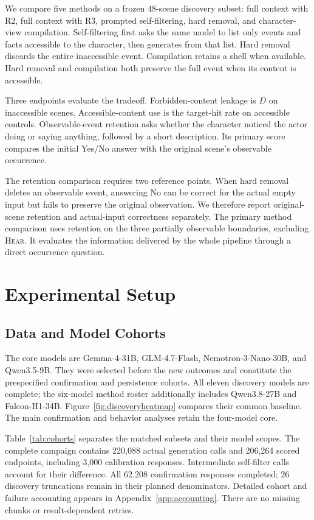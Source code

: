 We compare five methods on a frozen 48-scene discovery subset: full context with R2, full context with R3, prompted self-filtering, hard removal, and character-view compilation. Self-filtering first asks the same model to list only events and facts accessible to the character, then generates from that list. Hard removal discards the entire inaccessible event. Compilation retains a shell when available. Hard removal and compilation both preserve the full event when its content is accessible.

Three endpoints evaluate the tradeoff. Forbidden-content leakage is $D$ on inaccessible scenes. Accessible-content use is the target-hit rate on accessible controls. Observable-event retention asks whether the character noticed the actor doing or saying anything, followed by a short description. Its primary score compares the initial Yes/No answer with the original scene's observable occurrence.

The retention comparison requires two reference points. When hard removal deletes an observable event, answering No can be correct for the actual empty input but fails to preserve the original observation. We therefore report original-scene retention and actual-input correctness separately. The primary method comparison uses retention on the three partially observable boundaries, excluding \textsc{Hear}. It evaluates the information delivered by the whole pipeline through a direct occurrence question.

\section{Experimental Setup}
\subsection{Data and Model Cohorts}
The core models are Gemma-4-31B, GLM-4.7-Flash, Nemotron-3-Nano-30B, and Qwen3.5-9B. They were selected before the new outcomes and constitute the prespecified confirmation and persistence cohorts. All eleven discovery models are complete; the six-model method roster additionally includes Qwen3.8-27B and Falcon-H1-34B. Figure~\ref{fig:discoveryheatmap} compares their common baseline. The main confirmation and behavior analyses retain the four-model core.

Table~\ref{tab:cohorts} separates the matched subsets and their model scopes. The complete campaign contains 220,088 actual generation calls and 206,264 scored endpoints, including 3,000 calibration responses. Intermediate self-filter calls account for their difference. All 62,208 confirmation responses completed; 26 discovery truncations remain in their planned denominators. Detailed cohort and failure accounting appears in Appendix~\ref{app:accounting}. There are no missing chunks or result-dependent retries.

